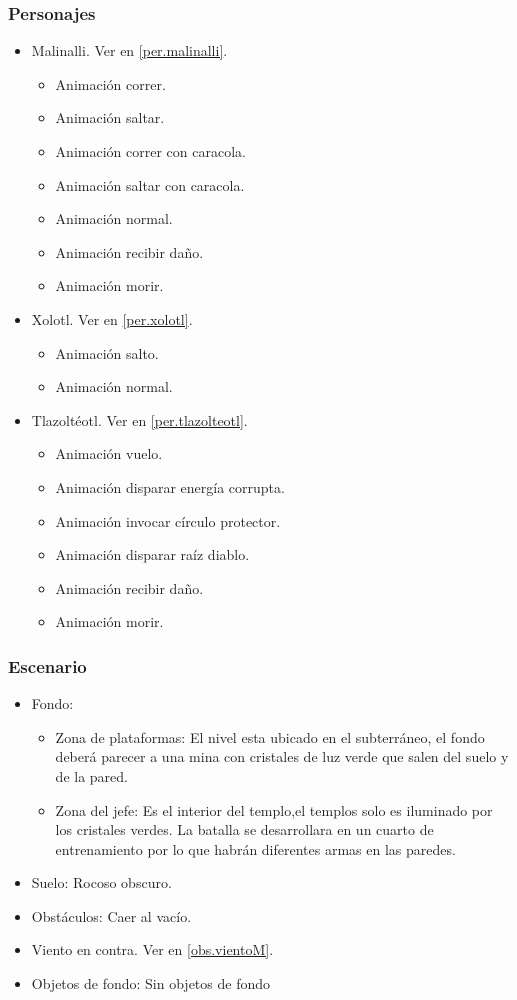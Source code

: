 \documentclass[11pt,letterpaper]{article}
\begin{document}
	\subsubsection{Personajes}
	\begin{itemize}
		\item Malinalli. Ver en \ref{per.malinalli}.
			\begin{itemize}
			\item Animación correr.
			\item Animación saltar.
			\item Animación correr con caracola.
			\item Animación saltar con caracola.
			\item Animación normal.
			\item Animación recibir daño.
			\item Animación morir.
		\end{itemize}
		\item Xolotl. Ver en \ref{per.xolotl}.
		\begin{itemize}
				\item Animación salto.
				\item Animación normal.
		\end{itemize}
		\item Tlazoltéotl. Ver en \ref{per.tlazolteotl}.
			\begin{itemize}
				\item Animación vuelo.
				\item Animación disparar energía corrupta.
				\item Animación invocar círculo protector.
				\item Animación disparar raíz diablo.
				\item Animación recibir daño.
				\item Animación morir.
			\end{itemize}
	\end{itemize}
\subsubsection{Escenario}
\begin{itemize} 
	\item Fondo:
	\begin{itemize}
		\item Zona de plataformas:
		El nivel esta ubicado en el subterráneo, el fondo deberá parecer a una mina con cristales de luz verde que salen del suelo y de la pared.
		\item Zona del jefe:
		Es el interior del templo,el templos solo es iluminado por los cristales verdes. La batalla se desarrollara en un cuarto de entrenamiento por lo que habrán diferentes armas en las paredes.
	\end{itemize}
	\item Suelo: Rocoso obscuro.
	\item Obstáculos: Caer al vacío.
	\item Viento en contra. Ver en \ref{obs.vientoM}.
	\item Objetos de fondo: Sin objetos de fondo
\end{itemize}	
\end{document}
